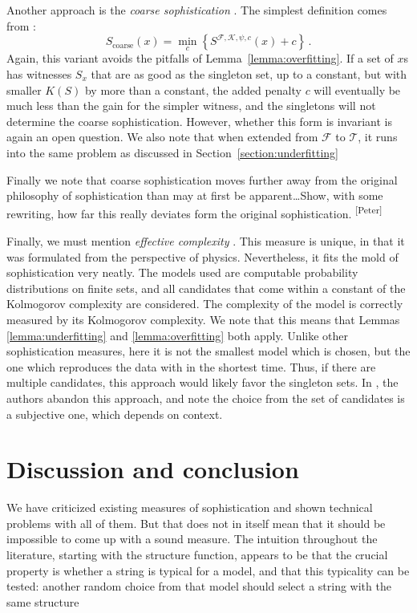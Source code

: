\documentclass{style/llncs}
\newcommand{\T}{\mathscr T}
\newcommand{\F}{\mathscr F}
\newcommand{\K}{\mathscr K}
\newcommand{\s}{S}
\newcommand{\p}{\,\text{.}}
\newcommand{\pb}[1]{\textcolor{OliveGreen}{\small #1 \textsuperscript{[Peter]} }}
\begin{document}
Another approach is the \emph{coarse sophistication} \cite{antunes2009sophistication}. The simplest definition comes from \cite{mota2013sophistication}:
\[
\s_\text{coarse}(x) = \min_c\left\{\s^{\F,\K,\psi,c}(x) + c \right\} \p
\]
Again, this variant avoids the pitfalls of Lemma~\ref{lemma:overfitting}. If a set of $x$s has witnesses $S_x$ that are as good as the singleton set, up to a constant, but with smaller $K(S)$ by more than a constant, the added penalty $c$ will eventually be much less than the gain for the simpler witness, and the singletons will not determine the coarse sophistication. However, whether this form is invariant is again an open question. We also note that when extended from $\F$ to $\T$, it runs into the same problem as discussed in Section~\ref{section:underfitting} 

Finally we note that coarse sophistication moves further away from the original philosophy of sophistication than may at first be apparent\ldots \pb{Show, with some rewriting, how far this really deviates form the original sophistication.}

Finally, we must mention \emph{effective complexity} \cite{gellmann1996information}. This measure is unique, in that it was formulated from the perspective of physics. Nevertheless, it fits the mold of sophistication very neatly. The models used are computable probability distributions on finite sets, and all candidates that come within a constant of the Kolmogorov complexity are considered. The complexity of the model is correctly measured by its Kolmogorov complexity. We note that this means that Lemmas \ref{lemma:underfitting} and \ref{lemma:overfitting} both apply. Unlike other sophistication measures, here it is not the smallest model which is chosen, but the one which reproduces the data with in the shortest time. Thus, if there are multiple candidates, this approach would likely favor the singleton sets. In \cite{gell2004nonextensive}, the authors abandon this approach, and note the choice from the set of candidates is a subjective one, which depends on context.

\section{Discussion and conclusion}
\label{section:conclusion} 

We have criticized existing measures of sophistication and shown technical problems with all of them. But that does not in itself mean that it should be impossible to come up with a sound measure. The intuition throughout the literature, starting with the structure function, appears to be that the crucial property is whether a string is typical for a model, and that this typicality can be tested: another random choice from that model should select a string with the same structure
\end{document}
